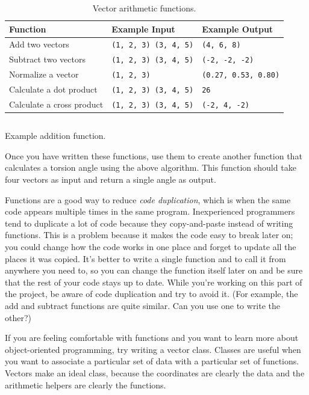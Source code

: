 \documentclass{article}
\begin{document}
\begin{table}[h]
\centering
\begin{tabular}{lll}
\toprule
Function                  & Example Input                & Example Output              \\
\midrule
Add two vectors           &
 \texttt{(1, 2, 3) (3, 4, 5)} & \texttt{(4, 6, 8)}          \\
Subtract two vectors      &
 \texttt{(1, 2, 3) (3, 4, 5)} & \texttt{(-2, -2, -2)}       \\
Normalize a vector        &
 \texttt{(1, 2, 3)}           & \texttt{(0.27, 0.53, 0.80)} \\
Calculate a dot product   &
 \texttt{(1, 2, 3) (3, 4, 5)} & \texttt{26}                 \\
Calculate a cross product &
 \texttt{(1, 2, 3) (3, 4, 5)} & \texttt{(-2, 4, -2)}        \\
\bottomrule
\end{tabular}
\caption{Vector arithmetic functions.}
\label{tab:vector-functions}
\end{table}

\begin{listing}[h]
 \inputminted{python}{example-function.py}
 \caption{Example addition function.}
 \label{lst:example-function}
\end{listing}

Once you have written these functions, use them to create another function that 
calculates a torsion angle using the above algorithm.  This function should 
take four vectors as input and return a single angle as output.  

Functions are a good way to reduce \emph{code duplication}, which is when the 
same code appears multiple times in the same program.  Inexperienced 
programmers tend to duplicate a lot of code because they copy-and-paste instead 
of writing functions.  This is a problem because it makes the code easy to 
break later on; you could change how the code works in one place and forget to 
update all the places it was copied.  It's better to write a single function 
and to call it from anywhere you need to, so you can change the function itself 
later on and be sure that the rest of your code stays up to date.  While you're 
working on this part of the project, be aware of code duplication and try to 
avoid it.  (For example, the add and subtract functions are quite similar.  Can 
you use one to write the other?)

If you are feeling comfortable with functions and you want to learn more about 
object-oriented programming, try writing a vector class.  Classes are useful 
when you want to associate a particular set of data with a particular set of 
functions.  Vectors make an ideal class, because the coordinates are clearly 
the data and the arithmetic helpers are clearly the functions.
\end{document}
